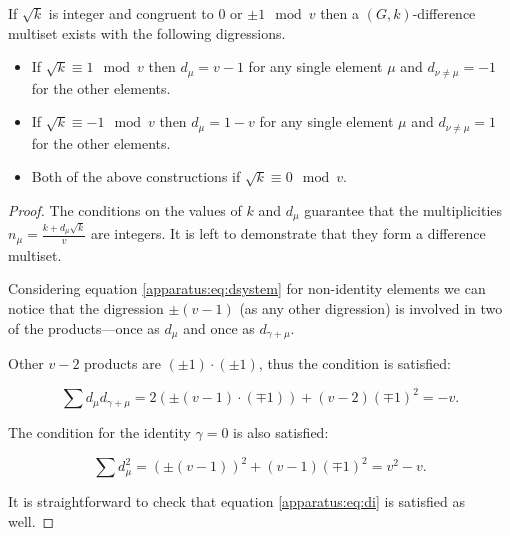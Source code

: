 \begin{theorem}
	\label{regular:theorem:regular}
	If $\sqrt k$ is integer and congruent to $0$ or $\pm 1 \mod v$ then a $(G,k)$-difference multiset exists with the following digressions.
		\begin{itemize}
			\item If $\sqrt k \equiv 1 \mod v$ then $d_\mu = v-1$ for any single element $\mu$ and $d_{\nu \neq \mu} = -1$ for the other elements.
			\item If $\sqrt k \equiv -1 \mod v$ then $d_\mu =1-v$ for any single element $\mu$ and $d_{\nu \neq \mu} = 1$ for the other elements.
			\item Both of the above constructions if $\sqrt k \equiv 0 \mod v$.
		\end{itemize}
\end{theorem}

\begin{proof}
	The conditions on the values of $k$ and $d_\mu$ guarantee that the multiplicities $n_\mu=\frac{k+d_\mu \sqrt k}v$ are integers. It is left to demonstrate that they form a difference multiset.
	
	Considering equation \eqref{apparatus:eq:dsystem} for non-identity elements we can notice that the digression $\pm(v-1)$ (as any other digression) is involved in two of the products---once as $d_\mu$ and once as $d_{\gamma+\mu}$.

	Other $v-2$ products are $(\pm1)\cdot(\pm1)$, thus the condition is satisfied:
	
	\begin{equation}
		\sum d_\mu d_{\gamma+\mu} = 2(\pm(v-1)\cdot(\mp 1)) + (v-2)(\mp1)^2 = -v.
	\end{equation}

	The condition for the identity $\gamma=0$ is also satisfied:
	
	\begin{equation}
		\sum d_\mu^2  = \left( \pm (v-1) \right)^2 + (v-1) \left( \mp 1 \right)^2 = v^2 - v.
	\end{equation}

	It is straightforward to check that equation \eqref{apparatus:eq:di} is satisfied as well.
\end{proof}
